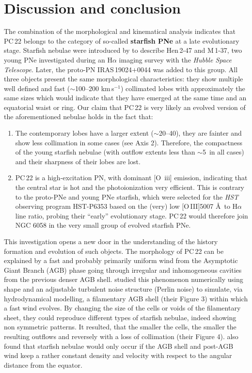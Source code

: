 \documentclass[fleqn,usenatbib,useAMS]{mnras}
\begin{document}
\section{Discussion and conclusion}\label{sec_dis}


The combination of the morphological and kinematical analysis indicates
that PC\,22 belongs to the category of so-called {\bf starfish PNe} at
a late evolutionary stage.
Starfish nebulae were introduced by \citet{Sahai2000} to describe Hen\,2-47
and M\,1-37, two young PNe investigated during an H$\alpha$ imaging survey
with the \emph{Hubble Space Telescope}.
Later, the proto-PN IRAS\,19024$+$0044 \citep{Sahai2005} was added to
this group.
All three objects present the same morphological characteristics: they show
multiple well defined and fast ($\sim$100--200 km\,s$^{-1}$) collimated lobes
with approximately the same sizes which would indicate that they have
emerged at the same time and an equatorial waist or ring.
Our claim that PC\,22 is very likely an evolved version of the
aforementioned nebulae holds in the fact that:
\begin{enumerate}
\item
The contemporary lobes have a larger extent ($\sim$20--40\arcsec), they
are fainter and show less collimation in some cases (see Axis 2).
Therefore, the compactness of the young starfish nebulae (with outflow
extents less than $\sim$5\arcsec\, in all cases) and their sharpness
of their lobes are lost.
\item
PC\,22 is a high-excitation PN, with dominant {[O~{\sc iii}]} emission,
indicating that the central star is hot and the photoionization very
efficient.
This is contrary to the proto-PNe and young PNe starfish, which were
selected for the \emph{HST} observing program HST-P6353 based on the
(very) low {[O\,{\sevensize III}]}5007 \AA\ to H$\alpha$ line ratio,
probing their ``early'' evolutionary stage.
PC\,22 would therefore join NGC 6058 \citep{Guillen2013} in the very
small group of evolved starfish PNe.
\end{enumerate}


This investigation opens a new door in the understanding of the history
formation and evolution of such objects.
The morphology of PC\,22 can be explained by a fast and probably primarily
uniform wind from the Asymptotic Giant Branch (AGB) phase going through
irregular and inhomogeneous cavities from the previous denser AGB shell.
\citet{Steffen2013} studied this phenomenon numerically using {\sc shape}
and an adjustable turbulent noise structure (Perlin noise) to simulate,
via hydrodynamical modelling, a filamentary AGB shell (their Figure 3)
within which a fast wind evolves.
By changing the size of the cells or voids of the filamentary sheet, they
could reproduce different types of starfish nebulae, indeed showing non
symmetric patterns.
It resulted, that the smaller the cells, the smaller the resulting outflows
and reversely with a loss of collimation (their Figure 4).
\citet{Steffen2013} also found that starfish nebulae would only occur if
the AGB shell and post-AGB wind keep a rather constant density and
velocity with respect to the angular distance from the equator.
\end{document}

